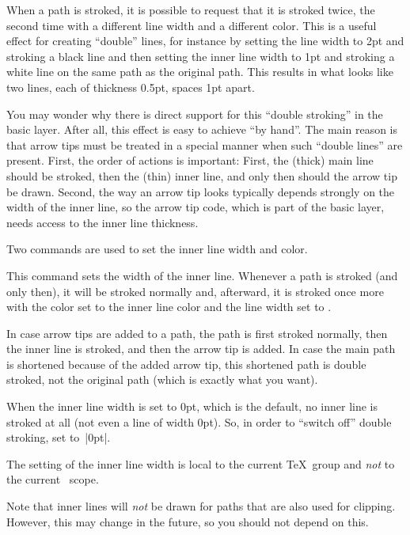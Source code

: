 When a path is stroked, it is possible to request that it is stroked
twice, the second time with a different line width and a different
color. This is a useful effect for creating ``double'' lines, for
instance by setting the line width to 2pt and stroking a black line
and then setting the inner line width to 1pt and stroking a white
line on the same path as the original path. This results in what looks
like two lines, each of thickness 0.5pt, spaces 1pt apart.

You may wonder why there is direct support for this ``double
stroking'' in the basic layer. After all, this effect is easy to
achieve ``by hand''. The main reason is that arrow tips must be
treated in a special manner when such ``double lines'' are
present. First, the order of actions is important: First, the (thick)
main line should be stroked, then the (thin) inner line, and only then
should the arrow tip be drawn. Second, the way an arrow tip looks
typically depends strongly on the width of the inner line, so the
arrow tip code, which is part of the basic layer, needs access to the
inner line thickness.

Two commands are used to set the inner line width and color.

\begin{command}{\pgfsetinnerlinewidth{}}
  This command sets the width of the inner line. Whenever a path is
  stroked (and only then), it will be stroked normally and, afterward,
  it is stroked once more with the color set to the inner line color
  and the line width set to .

  In case arrow tips are added to a path, the path is first stroked
  normally, then the inner line is stroked, and then the arrow tip is
  added. In case the main path is shortened because of the added arrow
  tip, this shortened path is double stroked, not the original path
  (which is exactly what you want).

  When the inner line width is set to 0pt, which is the default, no
  inner line is stroked at all (not even a line of width 0pt). So, in
  order to ``switch off'' double stroking, set 
  to~|0pt|.

  The setting of the inner line width is local to the current \TeX\
  group and \emph{not} to the current \pgfname\ scope.

  Note that inner lines will \emph{not} be drawn for paths that are
  also used for clipping. However, this may change in the future, so
  you should not depend on this.

\begin{codeexample}[]
\begin{pgfpicture}
  \pgfpathmoveto{\pgfpointorigin}
  \pgfpathlineto{\pgfpoint{1cm}{1cm}}
  \pgfpathlineto{\pgfpoint{1cm}{0cm}}
  \pgfsetlinewidth{2pt}
  \pgfsetinnerlinewidth{1pt}
\end{pgfpicture}
\end{codeexample}
\end{command}


